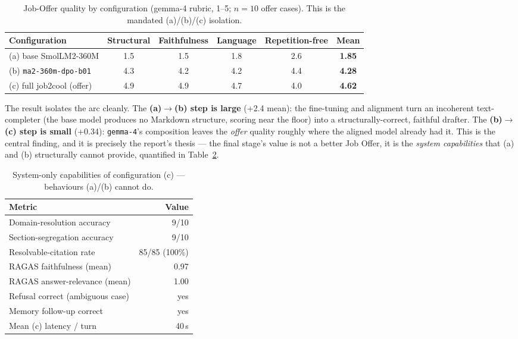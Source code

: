 \begin{table}[h]
\centering
\caption{Job-Offer quality by configuration (gemma-4 rubric, 1--5; $n=10$ offer cases).
This is the mandated (a)/(b)/(c) isolation.}
\label{tab:isolation}
\begin{tabular}{lccccc}
\toprule
\textbf{Configuration} & \textbf{Structural} & \textbf{Faithfulness} & \textbf{Language} & \textbf{Repetition-free} & \textbf{Mean} \\
\midrule
(a) base SmolLM2-360M        & 1.5 & 1.5 & 1.8 & 2.6 & \textbf{1.85} \\
(b) \texttt{ma2-360m-dpo-b01} & 4.3 & 4.2 & 4.2 & 4.4 & \textbf{4.28} \\
(c) full job2cool (offer)    & 4.9 & 4.9 & 4.7 & 4.0 & \textbf{4.62} \\
\bottomrule
\end{tabular}
\end{table}

The result isolates the arc cleanly. The \textbf{(a)$\to$(b) step is large} (+2.4 mean): the
fine-tuning and alignment turn an incoherent text-completer (the base model produces no
Markdown structure, scoring near the floor) into a structurally-correct, faithful drafter.
The \textbf{(b)$\to$(c) step is small} (+0.34): \verb|gemma-4|'s composition leaves the
\emph{offer} quality roughly where the aligned model already had it. This is the central
finding, and it is precisely the report's thesis --- the final stage's value is not a better
Job Offer, it is the \emph{system capabilities} that (a) and (b) structurally cannot provide,
quantified in Table~\ref{tab:system}.

\begin{table}[h]
\centering
\caption{System-only capabilities of configuration (c) --- behaviours (a)/(b) cannot do.}
\label{tab:system}
\begin{tabular}{lr}
\toprule
\textbf{Metric} & \textbf{Value} \\
\midrule
Domain-resolution accuracy        & 9/10 \\
Section-segregation accuracy      & 9/10 \\
Resolvable-citation rate          & 85/85 (100\%) \\
RAGAS faithfulness (mean)         & 0.97 \\
RAGAS answer-relevance (mean)     & 1.00 \\
Refusal correct (ambiguous case)  & yes \\
Memory follow-up correct          & yes \\
Mean (c) latency / turn           & 40\,s \\
\bottomrule
\end{tabular}
\end{table}

